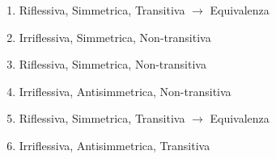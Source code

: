 \begin{soluzione}
    \begin{enumerate}\setlength\itemsep{1em}
\item  Riflessiva, Simmetrica, Transitiva $\rightarrow$ Equivalenza\\

\item Irriflessiva, Simmetrica, Non-transitiva\\


\item Riflessiva, Simmetrica, Non-transitiva\\


\item Irriflessiva, Antisimmetrica, Non-transitiva\\


\item Riflessiva, Simmetrica, Transitiva $\rightarrow$ Equivalenza\\


\item Irriflessiva, Antisimmetrica, Transitiva\\


\end{enumerate}
\end{soluzione}
